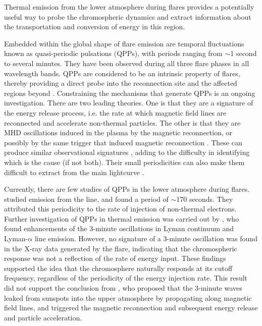 
Thermal emission from the lower atmosphere during flares
provides a potentially useful
way to probe the chromospheric dynamics and extract
information about the transportation and conversion of energy in this
region.


Embedded within the global shape of flare emission
are temporal fluctuations known as quasi-periodic pulsations (QPPs),
with periods ranging from $\sim$1 second to several minutes.
They have been observed during all three flare phases
in all wavelength bands.
QPPs are considered to be an intrinsic
property of flares, thereby providing a direct probe into the
reconnection site and the affected regions beyond \citep{Inglis2015}.
Constraining the mechanisms that generate QPPs is an ongoing investigation.
There are two leading theories.
One is that they are a signature of the energy release
process, i.e. the rate at which magnetic field lines are reconnected
and accelerate non-thermal particles. The other is that they are MHD
oscillations induced in the plasma by the magnetic reconnection, or
possibly by the same trigger that induced magnetic reconnection
\citep{Nakariakov2009}.
These can produce similar observational signatures
\citep{Brosius2016},
adding to the difficulty in identifying which is the cause (if not both).
Their small periodicities can also make them difficult to extract from the main
lightcurve \citep{VanDoorsselaere2016}.

Currently, there are few studies of QPPs in the lower atmosphere during flares.
\citep{Brosius2016} studied emission from the  line, and found
a period of $\sim$170 seconds. They
attributed this periodicity to the rate of injection of
non-thermal electrons.
Further investigation of QPPs in thermal emission was carried out by
\cite{Milligan2017}, who found enhancements of the 3-minute oscillations
in Lyman continuum and Lyman-$\alpha$ line emission.
However, no signature of a 3-minute oscillation was found in
the X-ray data generated by the flare, indicating
that the chromospheric response was not a
reflection of the rate of energy input.
These findings supported the idea that the chromosphere naturally
responds at its cutoff frequency, regardless of the periodicity of the
energy injection rate.
This result did not support the conclusion from
\cite{Sych2009}, who
proposed that the 3-minute waves leaked from sunspots into the upper
atmosphere by propagating along magnetic field lines, and triggered
the magnetic reconnection and subsequent energy release and particle
acceleration.


